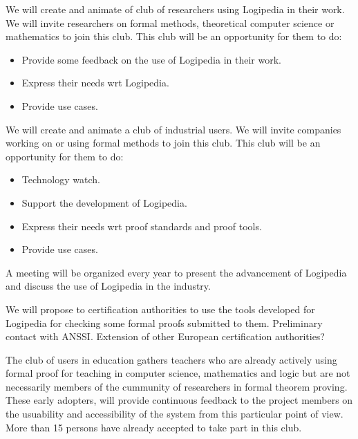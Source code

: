 \begin{workpackage}[id=dissemination,wphases=0-48,type=MGT,
  short=Dissemination,%
  title={Dissemination, communication, and exploitation},
  lead=Inr,
  BolRM=3,
  InrRM=10]
\begin{tasklist}
  \begin{task}[id=research,title=Expanding the use of Logipedia in research]
    We will create and animate of club of researchers using Logipedia
    in their work. We will invite researchers on formal methods,
    theoretical computer science or mathematics to join this
    club. This club will be an opportunity for them to do:
    \begin{itemize}
    \item Provide some feedback on the use of Logipedia in their work.
    \item Express their needs wrt Logipedia.
    \item Provide use cases.
    \end{itemize}
  \end{task}

  \begin{task}[id=industry,title=Expanding the use of Logipedia in the industry]
    We will create and animate a club of industrial users. We will
    invite companies working on or using formal methods to join this
    club. This club will be an opportunity for them to do:
    \begin{itemize}
    \item Technology watch.
    \item Support the development of Logipedia.
    \item Express their needs wrt proof standards and proof tools.
    \item Provide use cases.
    \end{itemize}
    A meeting will be organized every year to present the advancement
    of Logipedia and discuss the use of Logipedia in the industry.
  \end{task}

  \begin{task}[id=certif,title=Expanding the use of Logipedia within certification authorities]
    We will propose to certification authorities to use the tools
    developed for Logipedia for checking some formal proofs submitted
    to them. Preliminary contact with ANSSI. Extension of other
    European certification authorities?
  \end{task}

  \begin{task}[id=education,title=Expanding the use of Logipedia in education]

The club of users in education gathers teachers who are
already actively using formal proof for teaching in computer science,
mathematics and logic but are not necessarily members of the cummunity
of researchers in formal theorem proving. These early adopters, will
provide continuous feedback to the project members on the usuability
and accessibility of the system from this particular point of view.
More than 15 persons have already accepted to take part in this club.


\end{task}
\end{tasklist}
\end{workpackage}
